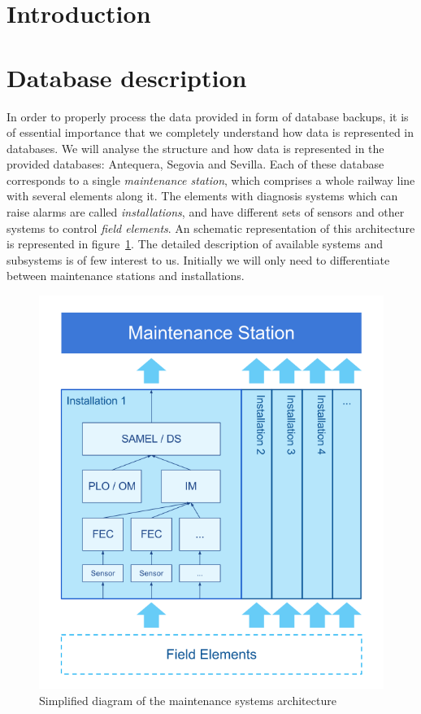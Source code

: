 \documentclass[a4paper,12pt]{article}
\begin{document}
\cleardoublepage
{} %
\listoftables %
\cleardoublepage

\setcounter{page}{1}
\section{Introduction}\label{sec:context}



\section{Database description}\label{sec:database_description}
In order to properly process the data provided in form of database backups, it is of essential importance that we completely understand how data is represented in databases. We will analyse the structure and how data is represented in the provided databases: Antequera, Segovia and Sevilla. Each of these database corresponds to a single \emph{maintenance station}, which comprises a whole railway line with several elements along it. The elements with diagnosis systems which can raise alarms are called \emph{installations}, and have different sets of sensors and other systems to control \emph{field elements}. An schematic representation of this architecture is represented in figure~\ref{fig:arch_stations}. The detailed description of available systems and subsystems is of few interest to us. Initially we will only need to differentiate between maintenance stations and installations.

\begin{figure}[hbt]
\includegraphics[width=\textwidth]{./img/arch_stations.png}
\caption{Simplified diagram of the maintenance systems architecture} \label{fig:arch_stations}
\end{figure}
\end{document}
